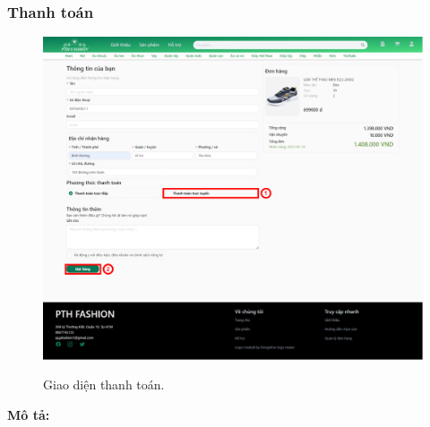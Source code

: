 \subsubsection{Thanh toán}
\begin{figure}[!htp]
    \centering
    \includegraphics[width=5in]{img/UI/new_customer/payment.png}
    \label{12}
    \newline
    \caption{Giao diện thanh toán.}
\end{figure}
\textbf{Mô tả:}
